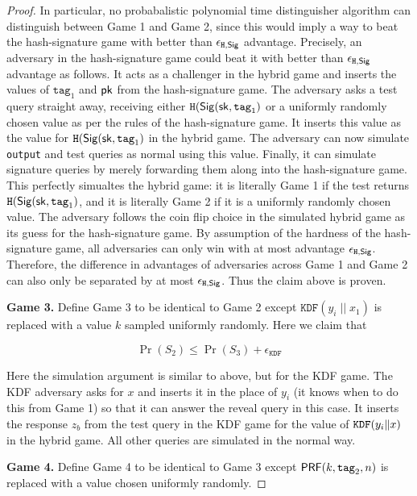 \documentclass[12pt]{article}
\newcommand{\myconcat}{ \;||\; }
\begin{document}
\begin{proof}
In particular, no probabalistic polynomial time distinguisher algorithm can distinguish between Game 1 and Game 2, since this would imply a way to beat the hash-signature game with better than $\epsilon_{\texttt{H}, \mathsf{Sig}}$ advantage. Precisely, an adversary in the hash-signature game could beat it with better than $\epsilon_{\texttt{H}, \mathsf{Sig}}$ advantage as follows. It acts as a challenger in the hybrid game and inserts the values of  $\texttt{tag}_1$ and $\mathsf{pk}$ from the hash-signature game. The adversary asks a test query straight away, receiving either $ \texttt{H}(\mathsf{Sig} (\mathsf{sk}, \mathrm{\texttt{tag}_1})$ or a uniformly randomly chosen value as per the rules of the hash-signature game. It inserts this value as the value for $ \texttt{H}(\mathsf{Sig} (\mathsf{sk}, \mathrm{\texttt{tag}_1})$ in the hybrid game. The adversary can now simulate \texttt{output} and test queries as normal using this value. Finally, it can simulate signature queries by merely forwarding them along into the hash-signature game. This perfectly simualtes the hybrid game: it is literally Game 1 if the test returns $ \texttt{H}(\mathsf{Sig} (\mathsf{sk}, \mathrm{\texttt{tag}_1})$, and it is literally Game 2 if it is a uniformly randomly chosen value. The adversary follows the coin flip choice in the simulated hybrid game as its guess for the hash-signature game. By assumption of the hardness of the hash-signature game, all adversaries can only win with at most advantage $\epsilon_{\texttt{H}, \mathsf{Sig}}$. Therefore, the difference in advantages of adversaries across Game 1 and Game 2 can also only be separated by at most $\epsilon_{\texttt{H}, \mathsf{Sig}}$. Thus the claim above is proven.

\noindent \textbf{Game 3.} Define Game 3 to be identical to Game 2 except 
$\texttt{KDF}(y_i \myconcat x_1)$ is replaced with a value $k$ sampled uniformly randomly. Here we claim that

$$
\Pr(S_2) \le \Pr(S_3) + \epsilon_{\texttt{KDF}}
$$

Here the simulation argument is similar to above, but for the KDF game. The KDF adversary asks for $x$ and inserts it in the place of $y_i$ (it knows when to do this from Game 1) so that it can answer the reveal query in this case. It inserts the response $z_b$ from the test query in the KDF game for the value of $\texttt{KDF}(y_i \| x)$ in the hybrid game. All other queries are simulated in the normal way.

\noindent \textbf{Game 4.} Define Game 4 to be identical to Game 3 except $\mathsf{PRF}(k, \texttt{tag}_2, n)$ is replaced with a value chosen uniformly randomly.


\end{proof}
\end{document}
